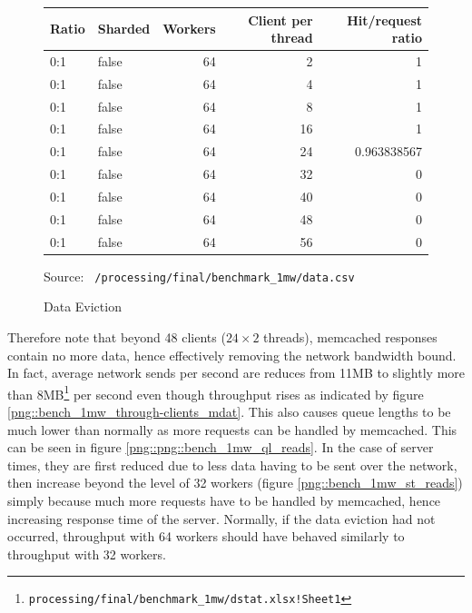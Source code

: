 \documentclass[11pt,a4paper]{article}
\newcommand{\source}[1]{\vspace{-1em}\caption*{\tiny{Source: \texttt{ {#1} }}} }
\begin{document}
\begin{figure}[!h]
    \centering
    \begin{tabular}{|l|l|r|r|r|}
        \hline Ratio & Sharded & Workers & Client per thread & Hit/request ratio \\
        \hline 0:1 & false & 64 & 2 & 1 \\
        \hline 0:1 & false & 64 & 4 & 1 \\
        \hline 0:1 & false & 64 & 8 & 1 \\
        \hline 0:1 & false & 64 & 16 & 1 \\
        \hline 0:1 & false & 64 & 24 & 0.963838567 \\
        \hline 0:1 & false & 64 & 32 & 0 \\
        \hline 0:1 & false & 64 & 40 & 0 \\
        \hline 0:1 & false & 64 & 48 & 0 \\
        \hline 0:1 & false & 64 & 56 & 0 \\
        \hline
    \end{tabular}
    \caption{Data Eviction}
    \source{/processing/final/benchmark\_1mw/data.csv}
    \label{table::data_eviction}
\end{figure}

Therefore note that beyond 48 clients ($24\times2$ threads), memcached responses contain no more data, hence effectively removing the network bandwidth bound. In fact, average network sends per second are reduces from 11MB to slightly more than 8MB\footnote{\texttt{processing/final/benchmark_1mw/dstat.xlsx!Sheet1}} per second even though throughput rises as indicated by figure \ref{png::bench_1mw_through-clients_mdat}. This also causes queue lengths to be much lower than normally as more requests can be handled by memcached. This can be seen in figure \ref{png::png::bench_1mw_ql_reads}. In the case of server times, they are first reduced due to less data having to be sent over the network, then increase beyond the level of 32 workers (figure \ref{png::bench_1mw_st_reads}) simply because much more requests have to be handled by memcached, hence increasing response time of the server. Normally, if the data eviction had not occurred, throughput with 64 workers should have behaved similarly to throughput with 32 workers.
\end{document}
